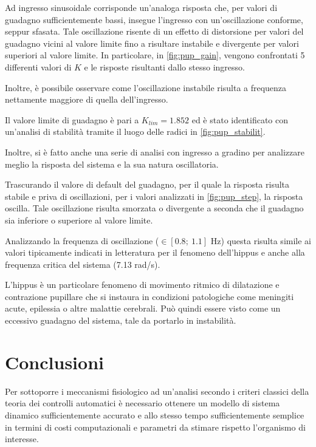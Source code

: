 Ad ingresso sinusoidale corrisponde un'analoga risposta che, per valori di guadagno sufficientemente bassi, insegue l'ingresso con un'oscillazione conforme, seppur sfasata.
Tale oscillazione risente di un effetto di distorsione per valori del guadagno vicini al valore limite fino a risultare instabile e divergente per valori superiori al valore limite. In particolare, in \cref{fig:pup_gain}, vengono confrontati 5 differenti valori di $K$ e le risposte risultanti dallo stesso ingresso. 

Inoltre, è possibile osservare come l'oscillazione instabile risulta a frequenza nettamente maggiore di quella dell'ingresso. 

Il valore limite di guadagno è pari a $K_{lim}=1.852$ ed è stato identificato con un'analisi di stabilità tramite il luogo delle radici in \cref{fig:pup_stabilit}.

Inoltre, si è fatto anche una serie di analisi con ingresso a gradino per analizzare meglio la risposta del sistema e la sua natura oscillatoria. 

Trascurando il valore di default del guadagno, per il quale la risposta risulta stabile e priva di oscillazioni, per i valori analizzati in \cref{fig:pup_step}, la risposta oscilla. Tale oscillazione risulta smorzata o divergente a seconda che il guadagno sia inferiore o superiore al valore limite.

Analizzando la frequenza di oscillazione ($\in [0.8;\:1.1]$ Hz) questa risulta simile ai valori tipicamente indicati in letteratura per il fenomeno dell'hippus \cite{turnbull_origins_2017} e anche alla frequenza critica del sistema (7.13 rad/s).

L'hippus è un particolare fenomeno di movimento ritmico di dilatazione e contrazione pupillare che si instaura in condizioni patologiche come meningiti acute, epilessia o altre malattie cerebrali. Può quindi essere visto come un eccessivo guadagno del sistema, tale da portarlo in instabilità. 



\section{Conclusioni}

Per sottoporre i meccanismi fisiologico ad un'analisi secondo i criteri classici della teoria dei controlli automatici è necessario ottenere un modello di sistema dinamico sufficientemente accurato e allo stesso tempo sufficientemente semplice in termini di costi computazionali e parametri da stimare rispetto l'organismo di interesse.

